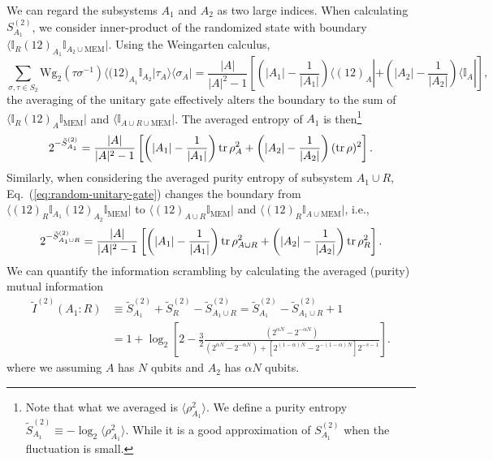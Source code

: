 \documentclass{SciPost}
\begin{document}
We can regard the subsystems $A_1$ and $A_2$ as two large indices.
When calculating $S^{(2)}_{A_1}$, we consider inner-product of the randomized state with boundary $\langle \mathbb I_R(12)_{A_1}\mathbb I_{A_2\cup\text{MEM}}|$.
Using the Weingarten calculus,
\begin{equation}\label{eq:alter-boundary}
	\sum_{\sigma, \tau \in S_2} \mathrm{Wg}_2\left(\tau \sigma^{-1}\right)
	\langle \mathbb (12)_{A_1} \mathbb I_{A_2}|\tau_{A} \rangle\langle\sigma_{A} |
	= \frac{|A|}{|A|^2-1} \left[\left(|A_1|-\frac{1}{|A_1|}\right) \langle(12)_A|+
	\left(|A_2|-\frac{1}{|A_2|}\right) \langle\mathbb I_A| \right],
\end{equation}
the averaging of the unitary gate effectively alters the boundary to the sum of $\langle \mathbb I_R(12)_{A}\mathbb I_\text{MEM}|$ and $\langle \mathbb I_{A\cup R\cup \text{MEM}}|$.
The averaged entropy of $A_1$ is then\footnote{Note that what we averaged is $\langle \rho^2_{A_1}\rangle$. We define a purity entropy $\tilde S^{(2)}_{A_1} \equiv -\log_2 \langle \rho^2_{A_1}\rangle$. While it is a good approximation of $S^{(2)}_{A_1}$ when the fluctuation is small.}
\begin{equation}
	2^{-\tilde S^{(2)}_{A_1}} 
	= \frac{|A|}{|A|^2-1}\left[\left(|A_1|-\frac{1}{|A_1|}\right)\operatorname{tr}\rho^2_A + \left(|A_2|-\frac{1}{|A_2|}\right)(\operatorname{tr}\rho)^2\right].
\end{equation}
Similarly, when considering the averaged purity entropy of subsystem $A_1 \cup R$, Eq.~(\ref{eq:random-unitary-gate}) changes the boundary from $\langle(12)_{R}\mathbb I_{A_1} (12)_{A_2}\mathbb I_\text{MEM}|$ to $\langle (12)_{A\cup R}\mathbb I_\text{MEM}|$ and $\langle(12)_{R}\mathbb I_{A\cup \text{MEM}}|$, i.e.,
\begin{equation}
\begin{aligned}
	2^{-\tilde S^{(2)}_{A_1\cup R}} 
	= \frac{|A|}{|A|^2-1}\left[\left(|A_1|-\frac{1}{|A_1|}\right)\operatorname{tr}\rho^2_{A\cup R}+\left(|A_2|-\frac{1}{|A_2|}\right)\operatorname{tr}\rho^2_R\right].
\end{aligned}
\end{equation}
We can quantify the information scrambling by calculating the averaged (purity) mutual information
\begin{equation}
\begin{aligned}
	\tilde I^{(2)}(A_1: R) &\equiv \tilde S^{(2)}_{A_1} + \tilde S^{(2)}_{R} - \tilde S^{(2)}_{A_1\cup R}
	= \tilde S^{(2)}_{A_1} - \tilde S^{(2)}_{A_1\cup R} + 1 \\
	&= 1 + \log_2 \left[2-\frac{3}{2}\frac{(2^{\alpha N}-2^{-\alpha N})}{(2^{\alpha N}-2^{-\alpha N})+[2^{(1-\alpha)N} - 2^{-(1-\alpha)N}]2^{-s-1}}\right].
\end{aligned}
\end{equation}
where we assuming $A$ has $N$ qubits and $A_2$ has $\alpha N$ qubits.
\end{document}

